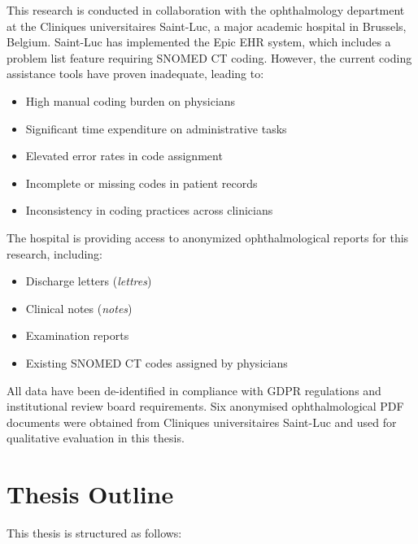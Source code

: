 This research is conducted in collaboration with the ophthalmology department at the Cliniques universitaires Saint-Luc, a major academic hospital in Brussels, Belgium. Saint-Luc has implemented the Epic EHR system, which includes a problem list feature requiring SNOMED CT coding. However, the current coding assistance tools have proven inadequate, leading to:

\begin{itemize}
    \item High manual coding burden on physicians
    \item Significant time expenditure on administrative tasks
    \item Elevated error rates in code assignment
    \item Incomplete or missing codes in patient records
    \item Inconsistency in coding practices across clinicians
\end{itemize}

The hospital is providing access to anonymized ophthalmological reports for this research, including:
\begin{itemize}
    \item Discharge letters (\textit{lettres})
    \item Clinical notes (\textit{notes})
    \item Examination reports
    \item Existing SNOMED CT codes assigned by physicians
\end{itemize}

All data have been de-identified in compliance with GDPR regulations and institutional review board requirements. Six anonymised ophthalmological PDF documents were obtained from Cliniques universitaires Saint-Luc and used for qualitative evaluation in this thesis.

\section{Thesis Outline}

This thesis is structured as follows:

